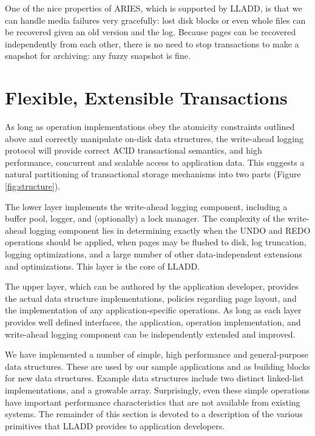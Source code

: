 \documentclass[10pt,letterpaper,twocolumn,english]{article}
\newcommand{\yad}{LLADD\xspace}
\begin{document}
One of the nice properties of ARIES, which is supported by \yad,
is that we can handle media failures very gracefully: lost disk blocks
or even whole files can be recovered given an old version and the log.
Because pages can be recovered independently from each other, there is
no need to stop transactions to make a snapshot for archiving: any
fuzzy snapshot is fine.



\section{Flexible, Extensible Transactions}
\label{flexibility}



As long as operation implementations obey the atomicity constraints
outlined above and correctly manipulate
on-disk data structures, the write-ahead logging protocol will provide 
correct ACID transactional semantics, and high performance, concurrent and scalable access to
application data.  This suggests a
natural partitioning of transactional storage mechanisms into two
parts (Figure \ref{fig:structure}).

The lower layer implements the write-ahead logging component,
including a buffer pool, logger, and (optionally) a lock manager.  
The complexity of the write-ahead logging component lies in
determining exactly when the UNDO and REDO operations should be
applied, when pages may be flushed to disk, log truncation, logging
optimizations, and a large number of other data-independent extensions
and optimizations.  This layer is the core of \yad.

The upper layer, which can be authored by the application developer,
provides the actual data structure implementations, policies regarding
page layout, and the
implementation of any application-specific operations.  As long as
each layer provides well defined interfaces, the application,
operation implementation, and write-ahead logging component can be
independently extended and improved.

We have implemented a number of simple, high performance
and general-purpose data structures.  These are used by our sample
applications and as building blocks for new data structures.  Example
data structures include two distinct linked-list implementations, and
a growable array.  Surprisingly, even these simple operations have
important performance characteristics that are not available from
existing systems. 
The remainder of this section is devoted to a description of the
various primitives that \yad provides to application developers.
\end{document}
